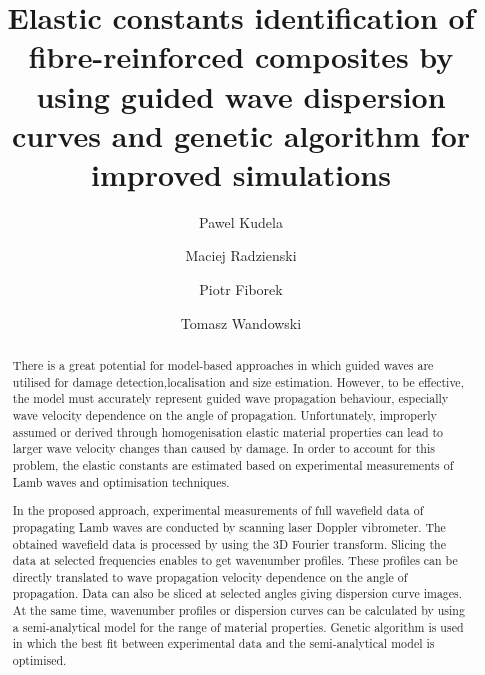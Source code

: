 \documentclass[preprint,12pt]{elsarticle}
\begin{document}
	\begin{frontmatter}
		
		\title{Elastic constants identification of fibre-reinforced composites by using guided wave dispersion curves and genetic algorithm for improved simulations}
		
		\address[IFFM]{Institute of Fluid Flow Machinery, Polish Academy of Sciences, Poland}
		
		\author{Pawel Kudela}
		\author{Maciej Radzienski}
		\author{Piotr Fiborek }
		\author{Tomasz Wandowski }	
		
		
\begin{abstract}
There is a great potential for model-based approaches in which guided waves are utilised for damage detection,localisation and size estimation. 
However, to be effective, the model must accurately represent guided wave propagation behaviour, especially wave velocity dependence on the angle of propagation. 
Unfortunately, improperly assumed or derived through homogenisation elastic material properties can lead to larger wave velocity changes than caused by damage. 
In order to account for this problem, the elastic constants are estimated based on experimental measurements of Lamb waves and optimisation techniques. 

In the proposed approach, experimental measurements of full wavefield data of propagating Lamb
waves are conducted by scanning laser Doppler vibrometer. 
The obtained wavefield data is processed by using the 3D Fourier transform. 
Slicing the data at selected frequencies enables to get wavenumber profiles. 
These profiles can be directly translated to wave propagation velocity dependence on the angle of propagation. 
Data can also be sliced at selected angles giving dispersion curve images. 
At the same time, wavenumber profiles or dispersion curves can be calculated by using a semi-analytical model for the range of material properties. 
Genetic algorithm is used in which the best fit between experimental data and the semi-analytical model is optimised.


\end{abstract}
\end{frontmatter}
\end{document}
